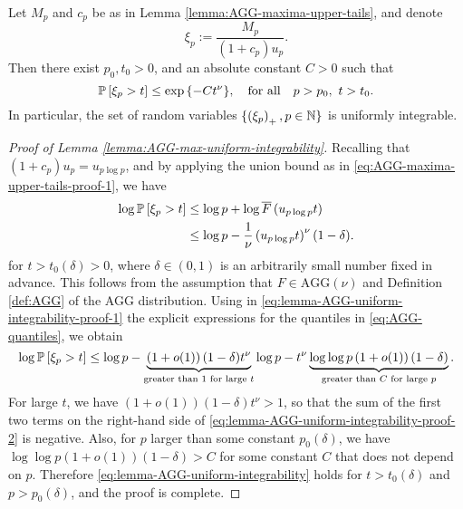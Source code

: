 \begin{lemma} \label{lemma:AGG-max-uniform-integrability}
Let $M_p$ and $c_p$ be as in Lemma \ref{lemma:AGG-maxima-upper-tails}, and denote 
$$
\xi_p := \frac{M_p}{(1+c_p)u_p}.
$$
Then there exist $p_0, t_0 > 0$, and an absolute constant $C>0$ such that
\begin{equation} \label{eq:lemma-AGG-uniform-integrability}
    \P\left[\xi_p > t \right]\le \exp{\{-Ct^\nu\}}, \quad \text{for all} \quad p>p_0,\ t>t_0.
\end{equation}
In particular, the set of random variables $\{\left(\xi_p\right)_+,p\in\N\}$ is uniformly integrable.
\end{lemma}
\begin{proof}[Proof of Lemma \ref{lemma:AGG-max-uniform-integrability}]
Recalling that $(1+c_p)u_p = u_{p\log{p}}$, and by applying the union bound as in \eqref{eq:AGG-maxima-upper-tails-proof-1}, we have
\begin{align}
    \log \P\left[\xi_p > t\right] 
        &\le \log p + \log{\overline{F}\left(u_{p\log{p}}t\right)} \nonumber \\
        &\le \log p - \frac{1}{\nu}\left(u_{p\log{p}}t\right)^\nu(1-\delta). \label{eq:lemma-AGG-uniform-integrability-proof-1}
\end{align}
for $t > t_0(\delta)>0$, where $\delta\in(0,1)$ is an arbitrarily small number fixed in advance. 
This follows from the assumption that $F\in\text{AGG}(\nu)$ and Definition \ref{def:AGG} of the AGG distribution.
Using in \eqref{eq:lemma-AGG-uniform-integrability-proof-1} the explicit expressions for the quantiles in \eqref{eq:AGG-quantiles}, we obtain
\begin{equation} \label{eq:lemma-AGG-uniform-integrability-proof-2}
    \log \P\left[\xi_p > t\right] \le \log p - \underbrace{\left(1+o(1)\right)(1-\delta)t^\nu}_{\text{greater than }1\text{ for large }t}\log{p} - t^\nu\underbrace{\log{\log{p}}\left(1+o(1)\right)(1-\delta)}_{\text{greater than }C\text{ for large }p}.
\end{equation}
For large $t$, we have $\left(1+o(1)\right)(1-\delta)t^\nu > 1$, so that the sum of the first two terms on the right-hand side of \eqref{eq:lemma-AGG-uniform-integrability-proof-2} is negative.
Also, for $p$ larger than some constant $p_0(\delta)$, we have $\log{\log{p}}\left(1+o(1)\right)(1-\delta) > C$ for some constant $C$ that does not depend on $p$.
Therefore \eqref{eq:lemma-AGG-uniform-integrability} holds for $t>t_0(\delta)$ and $p>p_0(\delta)$, and the proof is complete.
\end{proof}

